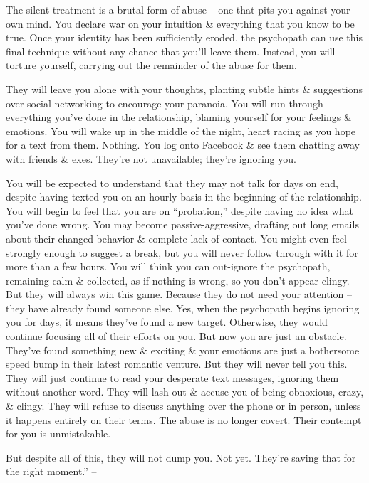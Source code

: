\documentclass{article}
\numberwithin{equation}{section}
\begin{document}
The silent treatment is a brutal form of abuse -- one that pits you against your own mind. You declare war on your intuition \& everything that you know to be true. Once your identity has been sufficiently eroded, the psychopath can use this final technique without any chance that you'll leave them. Instead, you will torture yourself, carrying out the remainder of the abuse for them.

They will leave you alone with your thoughts, planting subtle hints \& suggestions over social networking to encourage your paranoia. You will run through everything you've done in the relationship, blaming yourself for your feelings \& emotions. You will wake up in the middle of the night, heart racing as you hope for a text from them. Nothing. You log onto Facebook \& see them chatting away with friends \& exes. They're not unavailable; they're ignoring you.

You will be expected to understand that they may not talk for days on end, despite having texted you on an hourly basis in the beginning of the relationship. You will begin to feel that you are on ``probation,'' despite having no idea what you've done wrong. You may become passive-aggressive, drafting out long emails about their changed behavior \& complete lack of contact. You might even feel strongly enough to suggest a break, but you will never follow through with it for more than a few hours. You will think you can out-ignore the psychopath, remaining calm \& collected, as if nothing is wrong, so you don't appear clingy. But they will always win this game. Because they do not need your attention -- they have already found someone else. Yes, when the psychopath begins ignoring you for days, it means they've found a new target. Otherwise, they would continue focusing all of their efforts on you. But now you are just an obstacle. They've found something new \& exciting \& your emotions are just a bothersome speed bump in their latest romantic venture. But they will never tell you this. They will just continue to read your desperate text messages, ignoring them without another word. They will lash out \& accuse you of being obnoxious, crazy, \& clingy. They will refuse to discuss anything over the phone or in person, unless it happens entirely on their terms. The abuse is no longer covert. Their contempt for you is unmistakable.

But despite all of this, they will not dump you. Not yet. They're saving that for the right moment.'' -- \cite[pp. 69--70]{MacKenzie2015}
\end{document}
